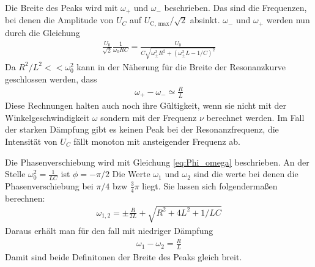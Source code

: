 Die Breite des Peaks wird mit $\omega_+$ und $\omega_-$ beschrieben.
Das sind die Frequenzen, bei denen die Amplitude von $U_C$ auf $U_\text{C, max}/\sqrt{2}$ absinkt.
$\omega_-$ und $\omega_+$ werden nun durch die Gleichung
\begin{align*}
    \frac{U_0}{\sqrt{2}} \frac{1}{\omega_0 RC} = \frac{U_0}{C\sqrt{\omega_\pm^2 R^2 + \left(\omega_\pm^2 L - 1/C\right)^2}}
\end{align*}
Da $R^2/ L^2 << \omega_0^2$ kann in der Näherung für die Breite der Resonanzkurve geschlossen werden, dass
\begin{align}
    \omega_+ - \omega_- \simeq \frac{R}{L}
    \label{eq:omega_Breite_pm}
\end{align}
Diese Rechnungen halten auch noch ihre Gültigkeit, 
wenn sie nicht mit der Winkelgeschwindigkeit $\omega$ sondern mit der Frequenz $\nu$ berechnet werden.
Im Fall der starken Dämpfung gibt es keinen Peak bei der Resonanzfrequenz, 
die Intensität von $U_C$ fällt monoton mit ansteigender Frequenz ab.

Die Phasenverschiebung wird mit Gleichung \eqref{eq:Phi_omega} beschrieben.
An der Stelle $\omega_0^2 = \frac{1}{LC}$ ist $\phi = -\pi/2$
Die Werte $\omega_1$ und $\omega_2$ sind die werte bei denen die Phasenverschiebung bei $\pi/4$ bzw $\frac{3}{4}\pi$ liegt.
Sie lassen sich folgendermaßen berechnen:
\begin{align*}
    \omega_{1,2} = \pm \frac{R}{2L} + \sqrt{R^2+ 4L^2 +1/LC}
\end{align*}
Daraus erhält man für den fall mit niedriger Dämpfung
\begin{align}
    \omega_1 -\omega_2 = \frac{R}{L}
    \label{eq:omega_Breite_12}
\end{align}
Damit sind beide Definitonen der Breite des Peaks gleich breit.